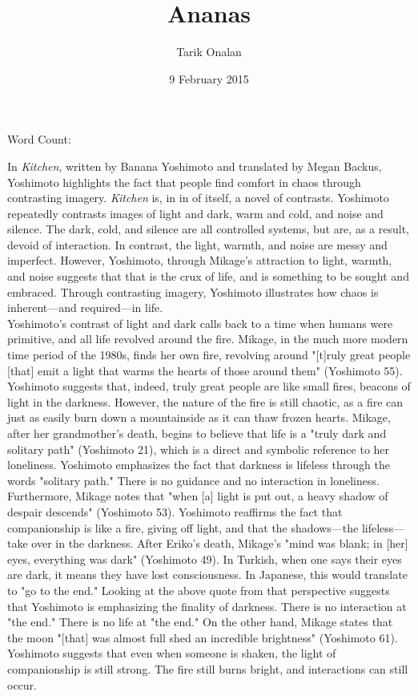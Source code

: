 \documentclass[12pt,a4paper]{article}
\title{Ananas}
\date{9 February 2015}
\author{Tarik Onalan}
\begin{document}
    \maketitle
    \centerline{Word Count: }
    In \textit{Kitchen}, written by Banana Yoshimoto and translated by Megan Backus,
    Yoshimoto highlights the fact that people find comfort in chaos through contrasting
    imagery. \textit{Kitchen} is, in in of itself, a novel of contrasts. Yoshimoto
    repeatedly contrasts images of light and dark, warm and cold, and noise and silence.
    The dark, cold, and silence are all controlled systems, but are, as a result, devoid
    of interaction. In contrast, the light, warmth, and noise are messy and imperfect.
    However, Yoshimoto, through Mikage's attraction to light, warmth, and noise suggests
    that that is the crux of life, and is something to be sought and embraced.
    Through contrasting imagery, Yoshimoto illustrates how chaos is inherent---and
    required---in life. \\

    Yoshimoto's contrast of light and dark calls back to a time when humans were
    primitive, and all life revolved around the fire. Mikage, in the much more modern
    time period of the 1980s, finds her own fire, revolving around "[t]ruly great people
    [that] emit a light that warms the hearts of those around them" (Yoshimoto 55). Yoshimoto
    suggests that, indeed, truly great people are like small fires, beacons of light in the
    darkness. However, the nature of the fire is still chaotic, as a fire can just as easily
    burn down a mountainside as it can thaw frozen hearts. Mikage, after her grandmother's
    death, begins to believe that life is a "truly dark and solitary path" (Yoshimoto 21),
    which is a direct and symbolic reference to her loneliness. Yoshimoto emphasizes
    the fact that darkness is lifeless through the words "solitary path." There is no
    guidance and no interaction in loneliness. Furthermore, Mikage notes that "when [a] light
    is put out, a heavy shadow of despair descends" (Yoshimoto 53). Yoshimoto reaffirms
    the fact that companionship is like a fire, giving off light, and that the shadows---the
    lifeless---take over in the darkness. After Eriko's death, Mikage's "mind was blank; in
    [her] eyes, everything was dark" (Yoshimoto 49). In Turkish, when one says their eyes
    are dark, it means they have lost consciousness. In Japanese, this would translate
    to "go to the end." Looking at the above quote from that perspective suggests that
    Yoshimoto is emphasizing the finality of darkness. There is no interaction at "the end."
    There is no life at "the end." On the other hand, Mikage states that the moon "[that]
    was almost full shed an incredible brightness" (Yoshimoto 61). Yoshimoto suggests
    that even when someone is shaken, the light of companionship is still strong. The fire
    still burns bright, and interactions can still occur. \\
\end{document}
